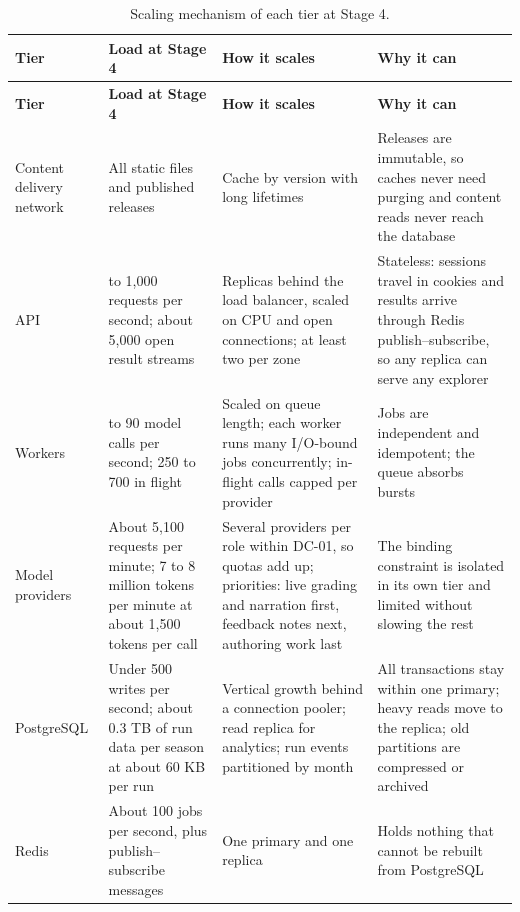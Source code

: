 {\small
\begin{longtable}{|>{\raggedright\arraybackslash}p{}|>{\raggedright\arraybackslash}p{}|>{\raggedright\arraybackslash}p{}|>{\raggedright\arraybackslash}p{}|}
\caption{Scaling mechanism of each tier at Stage 4.} \\
\hline
\textbf{Tier} & \textbf{Load at Stage 4} & \textbf{How it scales} & \textbf{Why it can} \\ \hline
\endfirsthead
\hline
\textbf{Tier} & \textbf{Load at Stage 4} & \textbf{How it scales} & \textbf{Why it can} \\ \hline
\endhead
Content delivery network & All static files and published releases & Cache by version with long lifetimes & Releases are immutable, so caches never need purging and content reads never reach the database \\ \hline
API & 500 to 1,000 requests per second; about 5,000 open result streams & Replicas behind the load balancer, scaled on CPU and open connections; at least two per zone & Stateless: sessions travel in cookies and results arrive through Redis publish--subscribe, so any replica can serve any explorer \\ \hline
Workers & 80 to 90 model calls per second; 250 to 700 in flight & Scaled on queue length; each worker runs many I/O-bound jobs concurrently; in-flight calls capped per provider & Jobs are independent and idempotent; the queue absorbs bursts\cite{r170} \\ \hline
Model providers & About 5,100 requests per minute; 7 to 8 million tokens per minute at about 1,500 tokens per call & Several providers per role within DC-01, so quotas add up; priorities: live grading and narration first, feedback notes next, authoring work last & The binding constraint is isolated in its own tier and limited without slowing the rest \\ \hline
PostgreSQL & Under 500 writes per second; about 0.3 TB of run data per season at about 60 KB per run & Vertical growth behind a connection pooler; read replica for analytics; run events partitioned by month & All transactions stay within one primary; heavy reads move to the replica; old partitions are compressed or archived \\ \hline
Redis & About 100 jobs per second, plus publish--subscribe messages & One primary and one replica & Holds nothing that cannot be rebuilt from PostgreSQL \\ \hline
\end{longtable}
}

